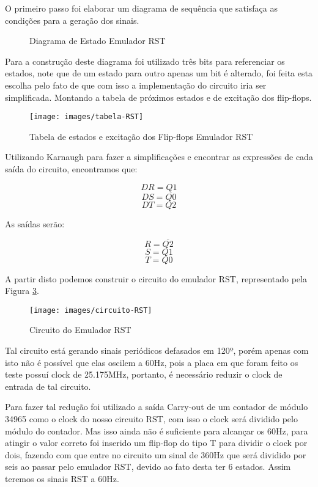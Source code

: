 \documentclass[12pt,a4paper,openany]{abntex2}
\begin{document}
O primeiro passo foi elaborar um diagrama de sequência que satisfaça as condições para a geração dos sinais.

\begin{figure}[!htp]
	\centering
	\caption{Diagrama de Estado Emulador RST}
	\label{fig:disgrama-de-estado-EmuladorRST}
\end{figure}

Para a construção deste diagrama foi utilizado três bits para referenciar os estados, note que de um estado para outro apenas um bit é alterado, foi feita esta escolha pelo fato de que com isso a implementação do circuito iria ser simplificada. Montando a tabela de próximos estados e de excitação dos flip-flops.

\begin{figure}[!htp]
	\centering
	\caption{Tabela de estados e excitação dos Flip-flops Emulador RST}
	\texttt{[image: images/tabela-RST]}
	\label{fig:tabela-RST}
\end{figure}

Utilizando Karnaugh para fazer a simplificações e encontrar as expressões de cada saída do circuito, encontramos que:

$$DR = Q1$$
$$DS = \overline{Q0}$$
$$DT = Q2$$

As saídas serão:

$$R = \overline{Q2}$$
$$S = Q1$$
$$T = Q0$$

A partir disto podemos construir o circuito do emulador RST, representado pela Figura \ref{fig:circuito-RST}.

\begin{figure}[!htp]
	\centering
	\caption{Circuito do Emulador RST}
	\texttt{[image: images/circuito-RST]}
	\label{fig:circuito-RST}
\end{figure}

Tal circuito está gerando sinais periódicos defasados em 120º, porém apenas com isto não é possível que elas oscilem a 60Hz, pois a placa em que foram feito os teste possuí clock de 25.175MHz, portanto, é necessário reduzir o clock de entrada de tal circuito. 

Para fazer tal redução foi utilizado a saída Carry-out de um contador de módulo 34965 como o clock do nosso circuito RST, com isso o clock será dividido pelo módulo do contador. Mas isso ainda não é suficiente para alcançar os 60Hz, para atingir o valor correto foi inserido um flip-flop do tipo T para dividir o clock por dois, fazendo com que entre no circuito um sinal de 360Hz que será dividido por seis ao passar pelo emulador RST, devido ao fato desta ter 6 estados. Assim teremos os sinais RST a 60Hz.
\end{document}
